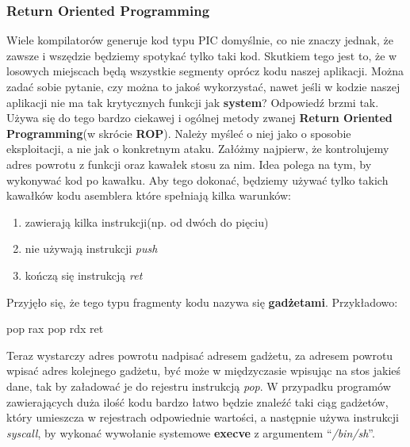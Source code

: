 \documentclass[polish]{kbk}
\begin{document}
\subsubsection{Return Oriented Programming}
Wiele kompilatorów generuje kod typu PIC domyślnie, co nie znaczy jednak, że zawsze 
i wszędzie będziemy spotykać tylko taki kod. Skutkiem tego jest to, że w losowych 
miejscach będą wszystkie segmenty oprócz kodu naszej aplikacji. Można zadać sobie 
pytanie, czy można to jakoś wykorzystać, nawet jeśli w kodzie naszej aplikacji 
nie ma tak krytycznych funkcji jak \textbf{system}? Odpowiedź brzmi tak. Używa 
się do tego bardzo ciekawej i ogólnej metody zwanej \textbf{Return Oriented 
Programming}(w skrócie \textbf{ROP}). Należy myśleć o niej jako o sposobie 
eksploitacji, a nie jak o konkretnym ataku. Załóżmy najpierw, że kontrolujemy 
adres powrotu z funkcji oraz kawałek stosu za nim. Idea polega na tym, by 
wykonywać kod po kawałku. Aby tego dokonać, będziemy używać tylko takich 
kawałków kodu asemblera które spełniają kilka warunków:
\begin{enumerate}
\item zawierają kilka instrukcji(np. od dwóch do pięciu)
\item nie używają instrukcji \emph{push}
\item kończą się instrukcją \emph{ret}
\end{enumerate}
Przyjęło się, że tego typu fragmenty kodu nazywa się \textbf{gadżetami}. Przykładowo:

\begin{flushleft}
pop rax\newline
pop rdx\newline
ret
\end{flushleft}

Teraz wystarczy adres powrotu nadpisać adresem gadżetu, za adresem powrotu wpisać 
adres kolejnego gadżetu, być może w międzyczasie wpisując na stos jakieś dane, tak 
by załadować je do rejestru instrukcją \emph{pop}. W przypadku programów zawierających 
duża ilość kodu bardzo łatwo będzie znaleźć taki ciąg gadżetów, który umieszcza w 
rejestrach odpowiednie wartości, a następnie używa instrukcji \emph{syscall}, 
by wykonać wywołanie systemowe \textbf{execve} z argumentem ``\textit{/bin/sh}''.
\end{document}
